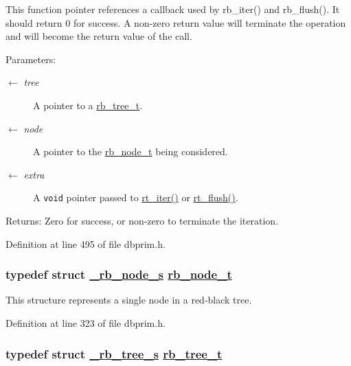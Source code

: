 This function pointer references a callback used by rb\_\-iter() and rb\_\-flush(). It should return 0 for success. A non-zero return value will terminate the operation and will become the return value of the call.

\begin{Desc}
\item[Parameters:]
\begin{description}
\item[\mbox{$\leftarrow$} {\em tree}]A pointer to a \hyperlink{group__dbprim__rbtree_ga0}{rb\_\-tree\_\-t}. \item[\mbox{$\leftarrow$} {\em node}]A pointer to the \hyperlink{group__dbprim__rbtree_ga1}{rb\_\-node\_\-t} being considered. \item[\mbox{$\leftarrow$} {\em extra}]A {\tt void} pointer passed to \hyperlink{group__dbprim__rbtree_ga12}{rt\_\-iter()} or \hyperlink{group__dbprim__rbtree_ga13}{rt\_\-flush()}.\end{description}
\end{Desc}
\begin{Desc}
\item[Returns:]Zero for success, or non-zero to terminate the iteration.\end{Desc}


Definition at line 495 of file dbprim.h.\hypertarget{group__dbprim__rbtree_ga1}{
\subsubsection[rb\_\-node\_\-t]{\setlength{\rightskip}{0pt plus 5cm}typedef struct \hyperlink{struct__rb__node__s}{\_\-rb\_\-node\_\-s} \hyperlink{struct__rb__node__s}{rb\_\-node\_\-t}}}
\label{group__dbprim__rbtree_ga1}


This structure represents a single node in a red-black tree.

Definition at line 323 of file dbprim.h.\hypertarget{group__dbprim__rbtree_ga0}{
\subsubsection[rb\_\-tree\_\-t]{\setlength{\rightskip}{0pt plus 5cm}typedef struct \hyperlink{struct__rb__tree__s}{\_\-rb\_\-tree\_\-s} \hyperlink{struct__rb__tree__s}{rb\_\-tree\_\-t}}}
\label{group__dbprim__rbtree_ga0}


